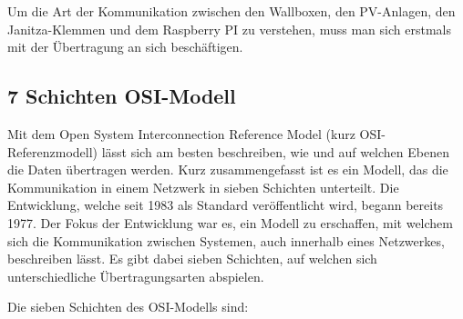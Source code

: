 \label{ModbusErklärung} 
Um die Art der Kommunikation zwischen den Wallboxen, den PV-Anlagen, den Janitza-Klemmen und dem Raspberry PI zu verstehen, muss man sich erstmals mit der Übertragung an sich beschäftigen.
\subsection{7 Schichten OSI-Modell} \label{OsiModell}


Mit dem Open System Interconnection Reference Model (kurz OSI-Referenzmodell) lässt sich am besten beschreiben, wie und auf welchen Ebenen die Daten übertragen werden. Kurz zusammengefasst ist es ein Modell, das die Kommunikation in einem Netzwerk in sieben Schichten unterteilt. Die Entwicklung, welche seit 1983 als Standard veröffentlicht wird, begann bereits 1977. Der Fokus der Entwicklung war es, ein Modell zu erschaffen, mit welchem sich die Kommunikation zwischen Systemen, auch innerhalb eines Netzwerkes, beschreiben lässt. Es gibt dabei sieben Schichten, auf welchen sich unterschiedliche Übertragungsarten abspielen.


Die sieben Schichten des OSI-Modells sind:


